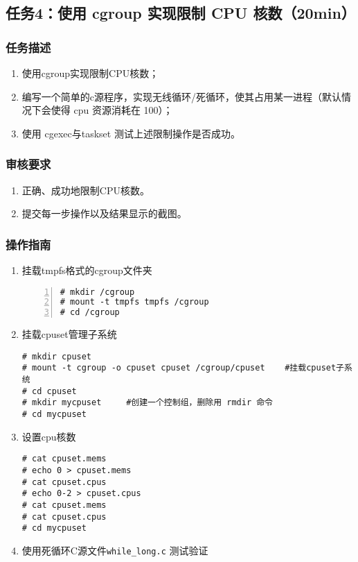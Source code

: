 \documentclass{article}
\begin{document}
\newpage

\subsection{任务4：使用 cgroup 实现限制 CPU 核数（20min）}

\subsubsection{任务描述}
\begin{enumerate}
    \item 使用cgroup实现限制CPU核数；
    \item 编写一个简单的c源程序，实现无线循环/死循环，使其占用某一进程（默认情况下会使得 cpu 资源消耗在 100）；
    \item 使用 cgexec与taskset 测试上述限制操作是否成功。
\end{enumerate}

\subsubsection{审核要求}
\begin{enumerate}
    \item 正确、成功地限制CPU核数。
    \item 提交每一步操作以及结果显示的截图。
\end{enumerate}

\subsubsection{操作指南}
\begin{enumerate}
    \item 挂载tmpfs格式的cgroup文件夹
\begin{lstlisting}[numbers=left]
# mkdir /cgroup
# mount -t tmpfs tmpfs /cgroup
# cd /cgroup
\end{lstlisting}
    \item 挂载cpuset管理子系统
\begin{lstlisting}
# mkdir cpuset
# mount -t cgroup -o cpuset cpuset /cgroup/cpuset    #挂载cpuset子系统
# cd cpuset
# mkdir mycpuset     #创建一个控制组，删除用 rmdir 命令
# cd mycpuset
\end{lstlisting}
    \item 设置cpu核数
\begin{lstlisting}
# cat cpuset.mems
# echo 0 > cpuset.mems
# cat cpuset.cpus
# echo 0-2 > cpuset.cpus
# cat cpuset.mems
# cat cpuset.cpus
# cd mycpuset
\end{lstlisting}    
    \item 使用死循环C源文件\verb|while_long.c| 测试验证
\end{enumerate}
\end{document}
